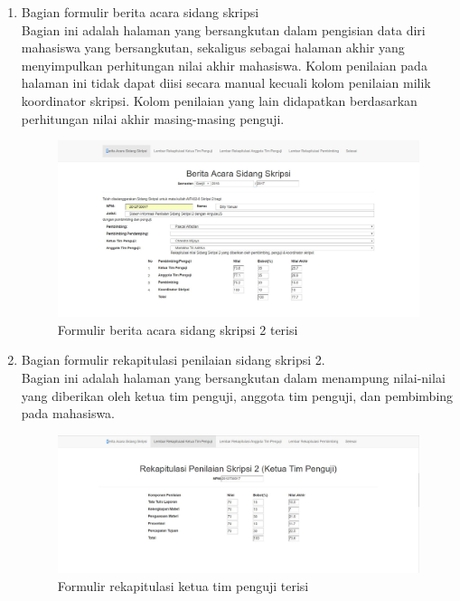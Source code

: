 	\begin{enumerate}
		\item Bagian formulir berita acara sidang skripsi\\
		Bagian ini adalah halaman yang bersangkutan dalam pengisian data diri mahasiswa yang bersangkutan, sekaligus sebagai halaman akhir yang menyimpulkan perhitungan nilai akhir mahasiswa. Kolom penilaian pada halaman ini tidak dapat diisi secara manual kecuali kolom penilaian milik koordinator skripsi. Kolom penilaian yang lain didapatkan berdasarkan perhitungan nilai akhir masing-masing penguji.
		\begin{figure}[H]
			\centering
			\includegraphics[scale=0.4]{Gambar/beritaacaraisi}
			\caption{Formulir berita acara sidang skripsi 2 terisi}
			\label{fig:beritaisi}
		\end{figure}
		\item Bagian formulir rekapitulasi penilaian sidang skripsi 2.\\
		Bagian ini adalah halaman yang bersangkutan dalam menampung nilai-nilai yang diberikan oleh ketua tim penguji, anggota tim penguji, dan pembimbing pada mahasiswa. 
		\begin{figure}[H]
			\centering
			\includegraphics[scale=0.4]{Gambar/ketuaisi}
			\caption{Formulir rekapitulasi ketua tim penguji terisi}
			\label{fig:ketuaisi}
		\end{figure}
		\begin{figure}[H]

\end{figure}
\end{enumerate}
